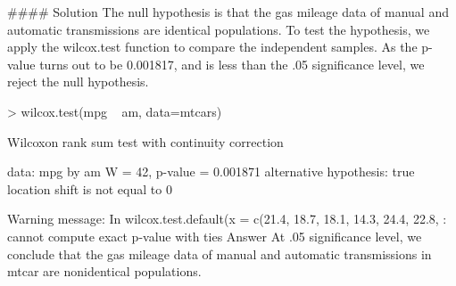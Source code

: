 \begin{frame}[fragile]
#### Solution
The null hypothesis is that the gas mileage data of manual and automatic transmissions are identical populations. To test the hypothesis, we apply the wilcox.test function to compare the independent samples. As the p-value turns out to be 0.001817, and is less than the .05 significance level, we reject the null hypothesis.

> wilcox.test(mpg ~ am, data=mtcars) 
 
        Wilcoxon rank sum test with continuity correction 
 
data:  mpg by am 
W = 42, p-value = 0.001871 
alternative hypothesis: true location shift is not equal to 0 
 
Warning message: 
In wilcox.test.default(x = c(21.4, 18.7, 18.1, 14.3, 24.4, 22.8,  : 
  cannot compute exact p-value with ties
Answer
At .05 significance level, we conclude that the gas mileage data of manual and automatic transmissions in mtcar are nonidentical populations.

\end{frame}

